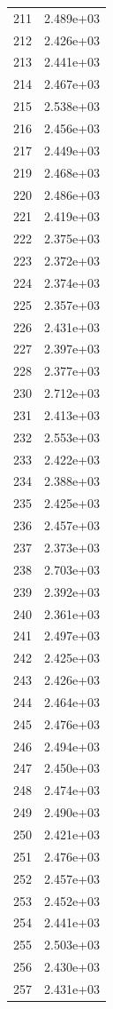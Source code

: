 \documentclass[12pt]{article}
\begin{document}
\begin{longtable}{@{}cc@{}}
211 & 2.489e+03 \\
212 & 2.426e+03 \\
213 & 2.441e+03 \\
214 & 2.467e+03 \\
215 & 2.538e+03 \\
216 & 2.456e+03 \\
217 & 2.449e+03 \\
219 & 2.468e+03 \\
220 & 2.486e+03 \\
221 & 2.419e+03 \\
222 & 2.375e+03 \\
223 & 2.372e+03 \\
224 & 2.374e+03 \\
225 & 2.357e+03 \\
226 & 2.431e+03 \\
227 & 2.397e+03 \\
228 & 2.377e+03 \\
230 & 2.712e+03 \\
231 & 2.413e+03 \\
232 & 2.553e+03 \\
233 & 2.422e+03 \\
234 & 2.388e+03 \\
235 & 2.425e+03 \\
236 & 2.457e+03 \\
237 & 2.373e+03 \\
238 & 2.703e+03 \\
239 & 2.392e+03 \\
240 & 2.361e+03 \\
241 & 2.497e+03 \\
242 & 2.425e+03 \\
243 & 2.426e+03 \\
244 & 2.464e+03 \\
245 & 2.476e+03 \\
246 & 2.494e+03 \\
247 & 2.450e+03 \\
248 & 2.474e+03 \\
249 & 2.490e+03 \\
250 & 2.421e+03 \\
251 & 2.476e+03 \\
252 & 2.457e+03 \\
253 & 2.452e+03 \\
254 & 2.441e+03 \\
255 & 2.503e+03 \\
256 & 2.430e+03 \\
257 & 2.431e+03 \\

\end{longtable}
\end{document}
